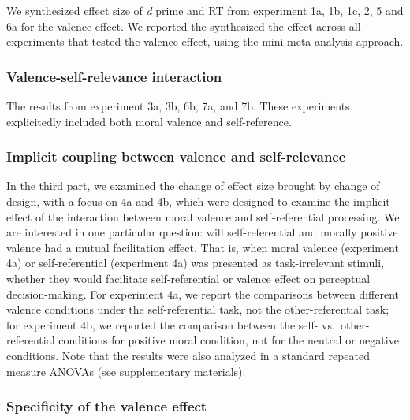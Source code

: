 \documentclass[man]{apa6}
\begin{document}
We synthesized effect size of \emph{d} prime and RT from experiment 1a, 1b, 1c, 2, 5 and 6a for the valence effect. We reported the synthesized the effect across all experiments that tested the valence effect, using the mini meta-analysis approach.

\hypertarget{valence-self-relevance-interaction}{%
\subsubsection{Valence-self-relevance interaction}\label{valence-self-relevance-interaction}}

The results from experiment 3a, 3b, 6b, 7a, and 7b. These experiments explicitedly included both moral valence and self-reference.

\hypertarget{implicit-coupling-between-valence-and-self-relevance}{%
\subsubsection{Implicit coupling between valence and self-relevance}\label{implicit-coupling-between-valence-and-self-relevance}}

In the third part, we examined the change of effect size brought by change of design, with a focus on 4a and 4b, which were designed to examine the implicit effect of the interaction between moral valence and self-referential processing. We are interested in one particular question: will self-referential and morally positive valence had a mutual facilitation effect. That is, when moral valence (experiment 4a) or self-referential (experiment 4a) was presented as task-irrelevant stimuli, whether they would facilitate self-referential or valence effect on perceptual decision-making. For experiment 4a, we report the comparisons between different valence conditions under the self-referential task, not the other-referential task; for experiment 4b, we reported the comparison between the self- vs.~other-referential conditions for positive moral condition, not for the neutral or negative conditions. Note that the results were also analyzed in a standard repeated measure ANOVAs (see supplementary materials).

\hypertarget{specificity-of-the-valence-effect}{%
\subsubsection{Specificity of the valence effect}\label{specificity-of-the-valence-effect}}
\end{document}
